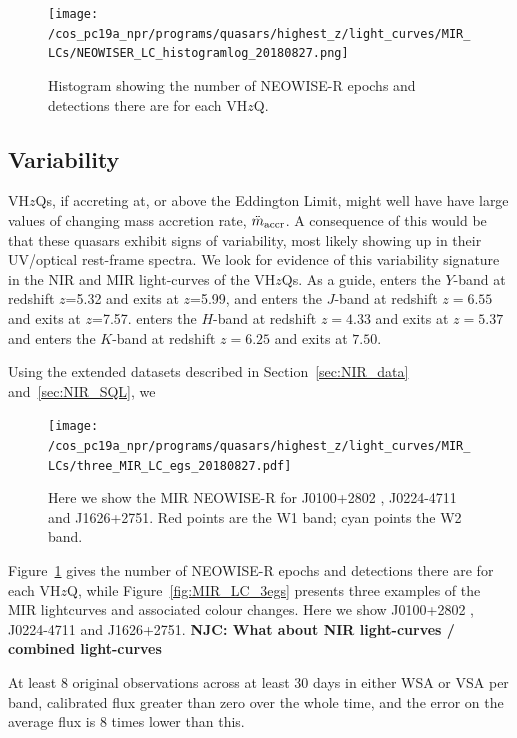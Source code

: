 \documentclass[usenatbib]{mnras}
\begin{document}
\begin{figure}
  \centering
  \texttt{[image: /cos\_pc19a\_npr/programs/quasars/highest\_z/light\_curves/MIR\_LCs/NEOWISER\_LC\_histogramlog\_20180827.png]}
  \vspace{-16pt}
  \caption[]
  {Histogram showing the number of NEOWISE-R epochs and detections there are for each 
    VH$z$Q.} 
  \label{fig:MIR_LC_epochs}
\end{figure}
   
\subsection{Variability}
VH$z$Qs, if accreting at, or above the Eddington Limit, might well
have have large values of changing mass accretion rate, $\ddot{m}_{\rm
accr}$. A consequence of this would be that these quasars exhibit signs
of variability, most likely showing up in their UV/optical rest-frame
spectra. We look for evidence of this variability signature in the NIR
and MIR light-curves of the VH$z$Qs. As a guide, \civ enters the
$Y$-band at redshift $z$=5.32 and exits at $z$=5.99, and enters the
$J$-band at redshift $z=6.55$ and exits at $z$=7.57. \mgii enters the
$H$-band at redshift $z=4.33$ and exits at $z=5.37$ and enters the
$K$-band at redshift $z=6.25$ and exits at $7.50$.

Using the extended datasets described in Section~\ref{sec:NIR_data} and~\ref{sec:NIR_SQL}, we 

\begin{figure}
  \texttt{[image: /cos\_pc19a\_npr/programs/quasars/highest\_z/light\_curves/MIR\_LCs/three\_MIR\_LC\_egs\_20180827.pdf]}
  \centering
  \caption[]
  {Here we show the MIR NEOWISE-R for J0100+2802 \citep{Wu2015}, J0224-4711 and  J1626+2751. 
    Red points are the W1 band; cyan points the W2 band.} 
  \label{fig::MIR_LC_3egs}
\end{figure}

Figure~\ref{fig:MIR_LC_epochs} gives the number of NEOWISE-R epochs and detections there are for each VH$z$Q, while 
Figure~\ref{fig:MIR_LC_3egs} presents three examples of the MIR lightcurves and
associated colour changes. Here we show J0100+2802 \citep{Wu2015}, J0224-4711 and  J1626+2751. 
{\bf NJC: What about NIR light-curves / combined light-curves}

At least 8 original observations across at least 30 days in either WSA or VSA per band, calibrated flux greater than zero over the whole time, and the error on the average flux is 8 times lower than this. 
\end{document}

